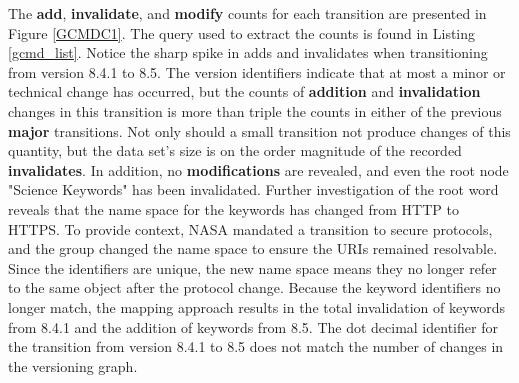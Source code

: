 The \textbf{add}, \textbf{invalidate}, and \textbf{modify} counts for each transition are presented in Figure \ref{GCMDC1}.
The query used to extract the counts is found in Listing \ref{gcmd_list}.
Notice the sharp spike in adds and invalidates when transitioning from version 8.4.1 to 8.5.
The version identifiers indicate that at most a minor or technical change has occurred, but the counts of \textbf{addition} and \textbf{invalidation} changes in this transition is more than triple the counts in either of the previous \textbf{major} transitions.
Not only should a small transition not produce changes of this quantity, but the data set's size is on the order magnitude of the recorded \textbf{invalidates}.
In addition, no \textbf{modifications} are revealed, and even the root node "Science Keywords" has been invalidated.
Further investigation of the root word reveals that the name space for the keywords has changed from HTTP to HTTPS.
To provide context, NASA mandated a transition to secure protocols, and the group changed the name space to ensure the URIs remained resolvable.
Since the identifiers are unique, the new name space means they no longer refer to the same object after the protocol change.
Because the keyword identifiers no longer match, the mapping approach results in the total invalidation of keywords from 8.4.1 and the addition of keywords from 8.5.
The dot decimal identifier for the transition from version 8.4.1 to 8.5 does not match the number of changes in the versioning graph.

